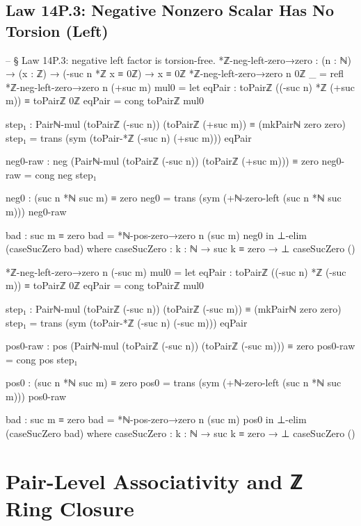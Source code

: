\documentclass[11pt,a4paper]{book}
\begin{document}
\subsection{Law 14P.3: Negative Nonzero Scalar Has No Torsion (Left)}

\begin{code}
-- § Law 14P.3: negative left factor is torsion-free.
*ℤ-neg-left-zero→zero : (n : ℕ) → (x : ℤ) → (-suc n *ℤ x ≡ 0ℤ) → x ≡ 0ℤ
*ℤ-neg-left-zero→zero n 0ℤ _ = refl
*ℤ-neg-left-zero→zero n (+suc m) mul0 =
  let
    eqPair : toPairℤ ((-suc n) *ℤ (+suc m)) ≡ toPairℤ 0ℤ
    eqPair = cong toPairℤ mul0

    step₁ : Pairℕ-mul (toPairℤ (-suc n)) (toPairℤ (+suc m)) ≡ (mkPairℕ zero zero)
    step₁ = trans (sym (toPair-*ℤ (-suc n) (+suc m))) eqPair

    neg0-raw : neg (Pairℕ-mul (toPairℤ (-suc n)) (toPairℤ (+suc m))) ≡ zero
    neg0-raw = cong neg step₁

    neg0 : (suc n *ℕ suc m) ≡ zero
    neg0 =
      trans
        (sym (+ℕ-zero-left (suc n *ℕ suc m)))
        neg0-raw

    bad : suc m ≡ zero
    bad = *ℕ-pos-zero→zero n (suc m) neg0
  in
  ⊥-elim (caseSucZero bad)
  where
    caseSucZero : {k : ℕ} → suc k ≡ zero → ⊥
    caseSucZero ()

*ℤ-neg-left-zero→zero n (-suc m) mul0 =
  let
    eqPair : toPairℤ ((-suc n) *ℤ (-suc m)) ≡ toPairℤ 0ℤ
    eqPair = cong toPairℤ mul0

    step₁ : Pairℕ-mul (toPairℤ (-suc n)) (toPairℤ (-suc m)) ≡ (mkPairℕ zero zero)
    step₁ = trans (sym (toPair-*ℤ (-suc n) (-suc m))) eqPair

    pos0-raw : pos (Pairℕ-mul (toPairℤ (-suc n)) (toPairℤ (-suc m))) ≡ zero
    pos0-raw = cong pos step₁

    pos0 : (suc n *ℕ suc m) ≡ zero
    pos0 =
      trans
        (sym (+ℕ-zero-left (suc n *ℕ suc m)))
        pos0-raw

    bad : suc m ≡ zero
    bad = *ℕ-pos-zero→zero n (suc m) pos0
  in
  ⊥-elim (caseSucZero bad)
  where
    caseSucZero : {k : ℕ} → suc k ≡ zero → ⊥
    caseSucZero ()
\end{code}

\section{Pair-Level Associativity and ℤ Ring Closure}
\end{document}
